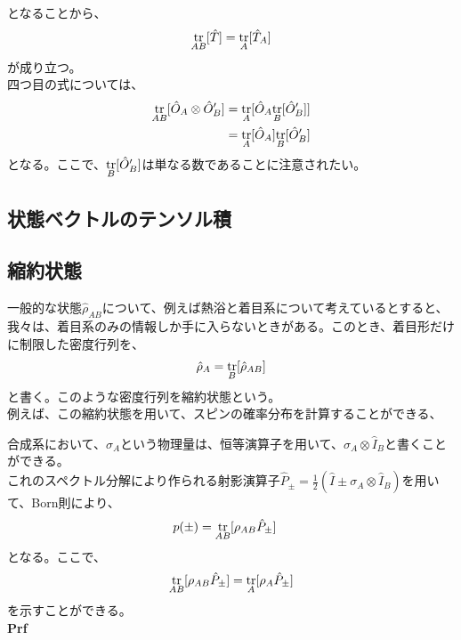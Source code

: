 \documentclass[a4paper,11pt]{jsarticle}
\begin{document}
となることから、
\begin{align}
    \underset{AB}{\trace}[\hat{T}] = \underset{A}{\trace}[\hat{T}_A]
\end{align}
が成り立つ。\\
四つ目の式については、
\begin{align}
    \underset{AB}{\trace}[\hat{O}_A \otimes \hat{O}'_B] &= \underset{A}{\trace}[\hat{O}_A \underset{B}{\trace}[\hat{O}'_B]]\\
    &=\underset{A}{\trace}[\hat{O}_A]\underset{B}{\trace}[\hat{O}'_B]
\end{align}
となる。ここで、$\underset{B}{\trace}[\hat{O}'_B]$は単なる数であることに注意されたい。

\subsection{状態ベクトルのテンソル積}

\subsection{縮約状態}
一般的な状態$\hat{\rho}_{AB}$について、例えば熱浴と着目系について考えているとすると、我々は、着目系のみの情報しか手に入らないときがある。このとき、着目形だけに制限した密度行列を、
\begin{align}
    \hat{\rho}_A = \underset{B}{\trace}[\hat{\rho}_{AB}]
\end{align}
と書く。このような密度行列を縮約状態という。\\
例えば、この縮約状態を用いて、スピンの確率分布を計算することができる、%

合成系において、$\sigma_A$という物理量は、恒等演算子を用いて、$\sigma_A\otimes \hat{I}_B$と書くことができる。\\
これのスペクトル分解により作られる射影演算子$\hat{P}_{\pm} = \frac{1}{2}(\hat{I}\pm \sigma_A\otimes \hat{I}_B)$を用いて、Born則により、
\begin{align}
    p(\pm) &= \underset{AB}{\trace}[\rho_{AB}\hat{P}_{\pm}]
\end{align}
となる。ここで、
\begin{align}
    \underset{AB}{\trace}[\rho_{AB}\hat{P}_{\pm}] = \underset{A}{\trace}[\rho_A\hat{P}_{\pm}]
\end{align}
を示すことができる。\\
\textbf{Prf}\\
\end{document}
